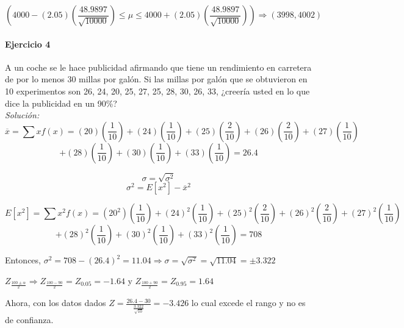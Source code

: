 \documentclass[12pt]{article}
\begin{document}
$$  \left(   4000 - (2.05)\left( \frac{48.9897}{\sqrt{10000}} \right)   \leq \mu \leq 4000 + (2.05)\left( \frac{48.9897}{\sqrt{10000}} \right)      \right)   \Rightarrow (3998,4002) $$


\paragraph{Ejercicio 4}
A un coche se le hace publicidad afirmando que tiene un rendimiento en carretera de por lo menos 30 millas por galón. Si las millas por galón que se obtuvieron en 10 experimentos son 26, 24, 20, 25, 27, 25, 28, 30, 26, 33, ¿creería usted en lo que dice la publicidad en un 90\%? \\

\textit{Solución: } 
$$ \overline{x} = \sum xf(x)= (20)\left( \frac{1}{10} \right) + (24)\left( \frac{1}{10} \right) + (25)\left( \frac{2}{10} \right) + (26)\left( \frac{2}{10} \right) + (27)\left( \frac{1}{10} \right) $$ $$ +  (28)\left( \frac{1}{10} \right) + (30)\left( \frac{1}{10} \right)+ (33)\left( \frac{1}{10} \right) = 26.4 $$

 
$$ \sigma = \sqrt{\sigma^2} $$
$$ \sigma^2 = E[x^2] - \overline{x}^2 $$

$$ E[x^2] = \sum x^2f(x)= (20^2)\left( \frac{1}{10} \right) + (24)^2\left( \frac{1}{10} \right) + (25)^2\left( \frac{2}{10} \right) + (26)^2\left( \frac{2}{10} \right) + (27)^2\left( \frac{1}{10} \right) $$ $$ +  (28)^2\left( \frac{1}{10} \right) + (30)^2\left( \frac{1}{10} \right)+ (33)^2\left( \frac{1}{10} \right) = 708 $$

Entonces, $ \sigma^2 = 708 - (26.4)^2 = 11.04  \Rightarrow \sigma = \sqrt{\sigma^2} = \sqrt{11.04} = \pm 3.322$ \\

\begin{center}
$ Z_{\frac{100 \pm \alpha}{2}} \Rightarrow  Z_{\frac{100-90}{2}} = Z_{0.05} = -1.64 $ y $ Z_{\frac{100+90}{2}} = Z_{0.95} = 1.64   $ 
\end{center}

Ahora, con los datos dados $ Z = \frac{26.4 - 30}{\frac{3.322}{\sqrt{10}}} = -3.426 $ lo cual excede el rango y no es de confianza.
\end{document}
